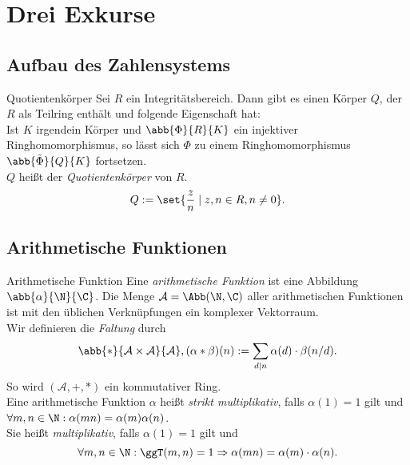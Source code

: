 \section{Drei Exkurse}

\subsection{Aufbau des Zahlensystems}

\begin{karte}{Quotientenkörper}
    Sei \(R\) ein Integritätsbereich. Dann gibt es einen Körper \(Q\), 
    der \(R\) als Teilring enthält und folgende Eigenschaft hat: \\
    Ist \(K\) irgendein Körper und \( \abb{\Phi}{R}{K} \) ein injektiver Ringhomomorphismus, 
    so lässt sich \(\Phi\) zu einem Ringhomomorphismus \(\abb{\tilde{\Phi}}{Q}{K}\) fortsetzen. \\
    \(Q\) heißt der \textit{Quotientenkörper} von \(R\).
    \[ Q := \set{ \frac{z}{n} \;|\;z,n\in R, n\neq 0 }. \]
\end{karte}

\subsection{Arithmetische Funktionen}

\begin{karte}{Arithmetische Funktion}
    Eine \textit{arithmetische Funktion} ist eine Abbildung \(\abb{\alpha}{\N}{\C}\). 
    Die Menge \(\mathcal{A} = \Abb(\N,\C)\) aller arithmetischen Funktionen ist mit den 
    üblichen Verknüpfungen ein komplexer Vektorraum. \\
    Wir definieren die \textit{Faltung} durch 
    \[ \abb{*}{\mathcal{A}\times \mathcal{A}}{\mathcal{A}}, 
    (\alpha * \beta)(n) := \sum_{d|n} \alpha(d) \cdot \beta(n/d). \]
    So wird \((\mathcal{A},+,*)\) ein kommutativer Ring. \\
    Eine arithmetische Funktion \(\alpha\) heißt \textit{strikt multiplikativ}, 
    falls \(\alpha(1) = 1\) gilt und \(\forall m,n\in \N: \alpha(mn)=\alpha(m)\alpha(n)\). \\
    Sie heißt \textit{multiplikativ}, falls \(\alpha(1) = 1\) gilt und 
    \[ \forall m,n\in\N: \ggT(m,n)=1\Rightarrow \alpha(mn)=\alpha(m)\cdot \alpha(n). \]
\end{karte}

